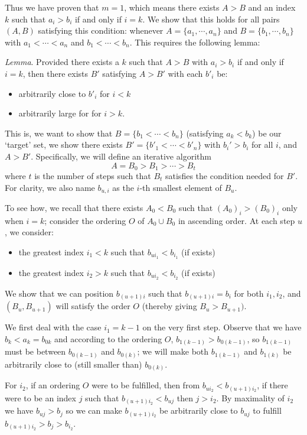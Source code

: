 \documentclass[11pt,a4paper]{article}
\begin{document}
\begin{enumerate}
	Thus we have proven that $m=1$, which means there exists $A>B$ and an index $k$ such that $a_i>b_i$ if and only if $i=k$. We show that this holds for all pairs $(A, B)$ satisfying this condition: whenever $A=\{a_1, \cdots , a_n\}$ and $B=\{b_1, \cdots , b_n\}$ with $a_1<\cdots < a_n$ and $b_1<\cdots < b_n$. 
	This requires the following lemma: 
	
	\emph{Lemma}. Provided there exists a $k$ such that $A>B$ with $a_i>b_i$ if and only if $i=k$, then there exists $B'$ satisfying $A>B'$ with each $b'_i$ be: 
	\begin{itemize}
		\item arbitrarily close to $b'_i$ for $i<k$
		\item arbitrarily large for for $i>k$. 
	\end{itemize}
	This is, we want to show that $B=\{b_1<\cdots < b_n\}$ (satisfying $a_k<b_k$) be our `target' set, we show there exists $B'=\{b'_1<\cdots < b'_n\}$ with $b_i'>b_i$ for all $i$, and $A>B'$. Specifically, we will define an iterative algorithm 
	\[
	A=B_0>B_1>\cdots > B_t
	\]
	where $t$ is the number of steps such that $B_t$ satisfies the condition needed for $B'$. For clarity, we also name $b_{u, i}$ as the $i$-th smallest element of $B_u$. 
	
	To see how, we recall that there exists $A_0<B_0$ such that $(A_0)_i>(B_0)_i$ only when $i=k$; consider the ordering $O$ of $A_0\cup B_0$ in ascending order. At each step $u$, we consider: 
	\begin{itemize}
		\item the greatest index $i_1 < k$ such that $b_{ui_1} < b_{i_1}$ (if exists)
		\item the greatest index $i_2 > k$ such that $b_{ui_2} < b_{i_2}$ (if exists)
	\end{itemize}
	 We show that we can position $b_{(u+1)i}$ such that $b_{(u+1)i}=b_i$ for both $i_1, i_2$, and $(B_u, B_{u+1})$ will satisfy the order $O$ (thereby giving $B_u>B_{u+1})$. 
	 
	 We first deal with the case $i_1=k-1$ on the very first step. Observe that we have $b_k<a_k=b_{0k}$ and according to the ordering $O$, $b_{1(k-1)}>b_{0(k-1)}$, so $b_{1(k-1)}$ must be between $b_{0(k-1)}$ and $b_{0(k)}$; we will make both $b_{1(k-1)}$ and $b_{1(k)}$ be arbitrarily close to (still smaller than) $b_{0(k)}$. 
	 
	 For $i_2$, if an ordering $O$ were to be fulfilled, then from $b_{ui_2} < b_{(u+1)i_2}$, if there were to be an index $j$ such that $b_{(u+1)i_2}<b_{uj}$ then $j>i_2$. By maximality of $i_2$ we have $b_{uj}>b_j$ so we can make $b_{(u+1)i_2}$ be arbitrarily close to $b_{uj}$ to fulfill $b_{(u+1)i_2}>b_j>b_{i_2}$. 
	 

\end{enumerate}
\end{document}
